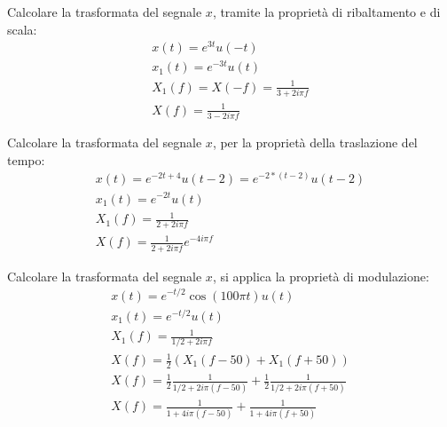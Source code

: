 \documentclass{article}
\numberwithin{equation}{subsection}
\begin{document}
Calcolare la trasformata del segnale $x$, tramite la proprietà di ribaltamento e di scala: 
\begin{gather*}
    x(t)=e^{3t}u(-t)\\
    x_1(t)=e^{-3t}u(t)\\
    X_1(f)=X(-f)=\displaystyle\frac{1}{3+2i\pi f}\\
    X(f)=\displaystyle\frac{1}{3-2i\pi f}
\end{gather*}


Calcolare la trasformata del segnale $x$, per la proprietà della traslazione del tempo:
\begin{gather*}
    x(t)=e^{-2t+4}u(t-2)=e^{-2*(t-2)}u(t-2)\\
    x_1(t)=e^{-2t}u(t)\\
    X_1(f)=\displaystyle\frac{1}{2+2i\pi f}\\
    X(f)=\displaystyle\frac{1}{2+2i\pi f}e^{-4i\pi f}
\end{gather*}

Calcolare la trasformata del segnale $x$, si applica la proprietà di modulazione: 
\begin{gather*}
    x(t)=e^{-t/2}\cos(100\pi t)u(t)\\
    x_1(t)=e^{-t/2}u(t)\\
    X_1(f)=\displaystyle\frac{1}{1/2+2i\pi f}\\
    X(f)=\displaystyle\frac{1}{2}\left(X_1(f-50)+X_1(f+50)\right)\\
    X(f)=\displaystyle\frac{1}{2}\frac{1}{1/2+2i\pi (f-50)}+\frac{1}{2}\frac{1}{1/2+2i\pi (f+50)}\\
    X(f)=\displaystyle\frac{1}{1+4i\pi (f-50)}+\frac{1}{1+4i\pi (f+50)}
\end{gather*}
\end{document}
